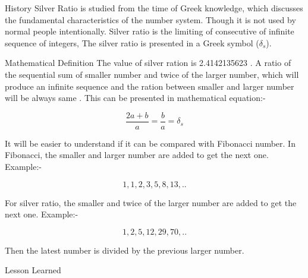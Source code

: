 \documentclass[final]{beamer}
\newlength{\onecolwid}
\newlength{\twocolwid}
\begin{document}
\begin{frame}[t]
\begin{columns}[t]
\begin{column}{\twocolwid}
\begin{columns}[t,totalwidth=\twocolwid]
\begin{column}{\onecolwid}

\begin{block}{History}
Silver Ratio is studied from the time of Greek knowledge, which discusses the fundamental characteristics of the number system. Though it is not used by normal people intentionally. Silver ratio is the limiting of consecutive  of infinite sequence of integers, The silver ratio is presented in a Greek symbol ($\delta_s$).

\end{block}



\begin{block}{Mathematical Definition}
The value of silver ration is 2.4142135623 \cite{jdc_silver}. A ratio of the sequential sum of smaller number and twice of the larger number, which will produce an infinite sequence and the ration between smaller and larger number will be always same \cite{numberphile_silver}. This can be presented in mathematical equation:- 

\[ \dfrac{2a + b}{a}  = \dfrac{b}{a} = \delta_s \]

It will be easier to understand if it can be compared with Fibonacci number.
In Fibonacci, the smaller and larger number are added to get the next one. 
Example:-

$$1,1,2,3,5,8,13,..$$

For silver ratio, the smaller and twice of the larger number are added to get the next one. Example:-

\[1,2,5,12,29,70,..\] 

Then the latest number is divided  by the previous larger number. 
\end{block}


\begin{block}{Lesson Learned}


\end{block}
\end{column}
\end{columns}
\end{column}
\end{columns}
\end{frame}
\end{document}
